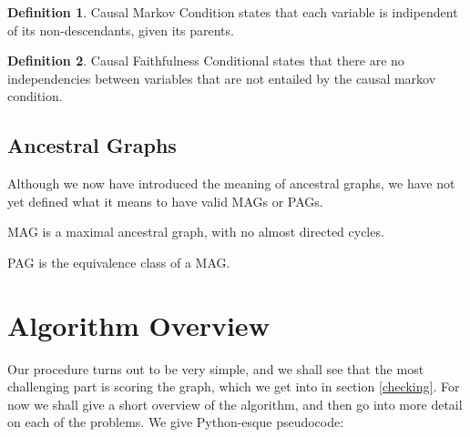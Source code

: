\documentclass[11pt,a4paper]{report}
\theoremstyle{definition}
\newtheorem{defn}{Definition}[section]
\begin{document}
\begin{defn}
  Causal Markov Condition states that each variable is indipendent of its
  non-descendants, given its parents.
\end{defn}

\begin{defn}
  Causal Faithfulness Conditional states that there are no independencies
  between variables that are not entailed by the causal markov condition.
\end{defn}


\section{Ancestral Graphs}\label{sec:ancestral_graphs}
Although we now have introduced the meaning of ancestral graphs, we have
not yet defined what it means to have valid MAGs or PAGs.

MAG is a maximal ancestral graph, with no almost directed cycles.

PAG is the equivalence class of a MAG.

\chapter{Algorithm Overview}\label{algorithm}
Our procedure turns out to be very simple, and we shall see that the most
challenging part is scoring the graph, which we get into in section
\ref{checking}. For now we shall give a short overview of the algorithm,
and then go into more detail on each of the problems. We give Python-esque
pseudocode:
\end{document}
